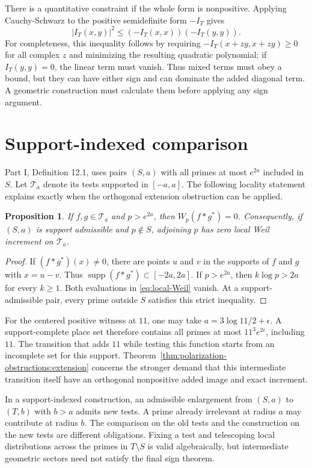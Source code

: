 \documentclass[11pt,letterpaper]{article}
\newtheorem{proposition}[theorem]{Proposition}
\theoremstyle{definition}
\theoremstyle{remark}
\newcommand{\T}{\mathcal T}
\newcommand{\supp}{\operatorname{supp}}
\begin{document}
There is a quantitative constraint if the whole form is
nonpositive. Applying Cauchy-Schwarz to the positive
semidefinite form $-I_T$ gives
\[
 |I_T(x,y)|^2\leq(-I_T(x,x))(-I_T(y,y)).
\]
For completeness, this inequality follows by requiring
$-I_T(x+zy,x+zy)\geq0$ for all complex $z$ and minimizing
the resulting quadratic polynomial; if $I_T(y,y)=0$, the
linear term must vanish. Thus mixed terms must obey a bound,
but they can have either sign and can dominate the added
diagonal term. A geometric construction must calculate them
before applying any sign argument.

\section{Support-indexed comparison}
\label{sec:support}

Part I, Definition 12.1,
uses pairs $(S,a)$ with all primes at most $e^{2a}$ included
in $S$. Let $\T_a$ denote its tests supported in $[-a,a]$.
The following locality statement explains exactly when the
orthogonal extension obstruction can be applied.

\begin{proposition}
\label{prop:polarization-obstructions:locality}
If $f,g\in\T_a$ and $p>e^{2a}$, then $W_p(f*g^*)=0$.
Consequently, if $(S,a)$ is support admissible and $p\notin S$,
adjoining $p$ has zero local Weil increment on $\T_a$.
\end{proposition}
\begin{proof}
If $(f*g^*)(x)\ne0$, there are points $u$ and $v$ in the
supports of $f$ and $g$ with $x=u-v$. Thus
$\supp(f*g^*)\subset[-2a,2a]$. If $p>e^{2a}$, then
$k\log p>2a$ for every $k\geq1$. Both evaluations in
\eqref{eq:local-Weil} vanish. At a support-admissible pair,
every prime outside $S$ satisfies this strict inequality.
\end{proof}

For the centered positive witness at $11$, one may take
$a=3\log11/2+\epsilon$. A support-complete place set
therefore contains all primes at most $11^3e^{2\epsilon}$,
including $11$. The transition that adds $11$ while testing
this function starts from an incomplete set for this support.
Theorem~\ref{thm:polarization-obstructions:extension} concerns
the stronger demand that this intermediate transition itself
have an orthogonal nonpositive added image and exact increment.

In a support-indexed construction, an admissible enlargement
from $(S,a)$ to $(T,b)$ with $b>a$ admits new tests. A prime
already irrelevant at radius $a$ may contribute at radius $b$.
The comparison on the old tests and the construction on the
new tests are different obligations. Fixing a test and
telescoping local distributions across the primes in $T\setminus S$
is valid algebraically, but intermediate geometric sectors
need not satisfy the final sign theorem.
\end{document}
